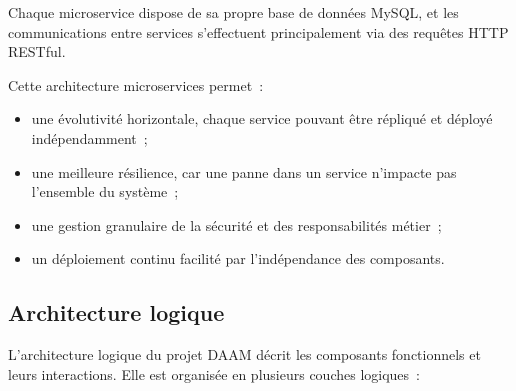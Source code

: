 Chaque microservice dispose de sa propre base de données MySQL, et les
communications entre services s'effectuent principalement via des requêtes
HTTP RESTful.

Cette architecture microservices permet~:
\begin{itemize}
  \item une évolutivité horizontale, chaque service pouvant être
        répliqué et déployé indépendamment~;
  \item une meilleure résilience, car une panne dans un service
        n'impacte pas l'ensemble du système~;
  \item une gestion granulaire de la sécurité et des responsabilités
        métier~;
  \item un déploiement continu facilité par l'indépendance des
        composants.
\end{itemize}


\subsection{Architecture logique}

L'architecture logique du projet DAAM décrit les composants fonctionnels
et leurs interactions. Elle est organisée en plusieurs couches logiques~:


